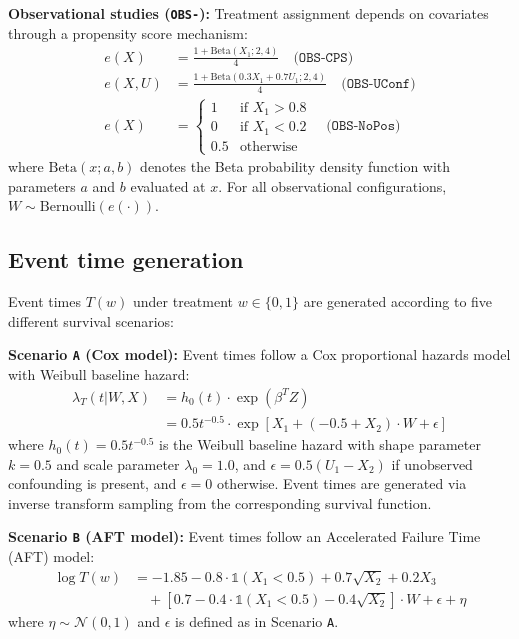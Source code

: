 \documentclass{article} %
\newcommand{\ind}{\mathds{1}}
\begin{document}
\textbf{Observational studies (\texttt{OBS-}):} Treatment assignment depends on covariates through a propensity score mechanism:
\begin{align*}
e(X) &= \frac{1 + \text{Beta}(X_{1}; 2, 4)}{4} \quad \texttt{(OBS-CPS)} \\
e(X, U) &= \frac{1 + \text{Beta}(0.3X_{1} + 0.7U_{1}; 2, 4)}{4} \quad \texttt{(OBS-UConf)} \\
e(X) &= \begin{cases} 
1 & \text{if } X_{1} > 0.8 \\
0 & \text{if } X_{1} < 0.2 \\
0.5 & \text{otherwise}
\end{cases} \quad \texttt{(OBS-NoPos)}
\end{align*}
where $\text{Beta}(x; a, b)$ denotes the Beta probability density function with parameters $a$ and $b$ evaluated at $x$. For all observational configurations, $W \sim \text{Bernoulli}(e(\cdot))$.

\subsection{Event time generation}
Event times $T(w)$ under treatment $w\in\{0,1\}$ are generated according to five different survival scenarios:

\textbf{Scenario \texttt{A} (Cox model):} Event times follow a Cox proportional hazards model with Weibull baseline hazard:
\begin{align*}
\lambda_T(t | W, X) &= h_0(t) \cdot \exp(\beta^T Z) \\
&= 0.5t^{-0.5} \cdot \exp[X_{1} + (-0.5 + X_{2}) \cdot W + \epsilon]
\end{align*}
where $h_0(t) = 0.5t^{-0.5}$ is the Weibull baseline hazard with shape parameter $k=0.5$ and scale parameter $\lambda_0=1.0$, and $\epsilon = 0.5(U_{1} - X_{2})$ if unobserved confounding is present, and $\epsilon = 0$ otherwise. Event times are generated via inverse transform sampling from the corresponding survival function.

\textbf{Scenario \texttt{B} (AFT model):} Event times follow an Accelerated Failure Time (AFT) model:
\begin{align*}
\log T(w) &= -1.85 - 0.8 \cdot \ind(X_{1} < 0.5) + 0.7\sqrt{X_{2}} + 0.2X_{3} \\
&\quad + [0.7 - 0.4 \cdot \ind(X_{1} < 0.5) - 0.4\sqrt{X_{2}}] \cdot W + \epsilon + \eta
\end{align*}
where $\eta \sim \mathcal{N}(0,1)$ and $\epsilon$ is defined as in Scenario \texttt{A}.
\end{document}
